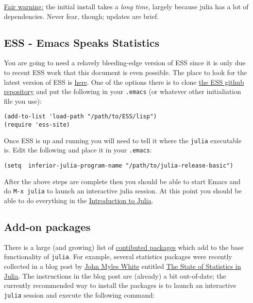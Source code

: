 \documentclass[11pt]{article}
\begin{document}
\underline{Fair warning:} the initial install takes a \emph{long time}, largely because julia has a lot of dependencies.  Never fear, though; updates are brief.
\subsection[ESS - Emacs Speaks Statistics]{ESS - Emacs Speaks Statistics}
\label{sec-1-2}

You are going to need a relavely bleeding-edge version of ESS since it is only due to recent ESS work that this document is even possible.  The place to look for the latest version of ESS is \href{http://stat.ethz.ch/ESS/index.php?Section=download}{here}.  One of the options there is to clone \href{https://github.com/emacs-ess/ESS}{the ESS github repository} and put the following in your \texttt{.emacs} (or whatever other initialiation file you use):

\begin{verbatim}
(add-to-list 'load-path "/path/to/ESS/lisp")
(require 'ess-site)
\end{verbatim}

Once ESS is up and running you will need to tell it where the \texttt{julia} executable is. Edit the following and place it in your \texttt{.emacs}:  

\begin{verbatim}
(setq  inferior-julia-program-name "/path/to/julia-release-basic")
\end{verbatim}

After the above steps are complete then you should be able to start Emacs and do \texttt{M-x julia} to launch an interactive julia session.  At this point you should be able to do everything in the \href{file://intro-julia.org}{Introduction to Julia}.
\subsection[Add-on packages]{Add-on packages}
\label{sec-1-3}

There is a large (and growing) list of \href{http://docs.julialang.org/en/release-0.1/packages/packagelist/}{contibuted packages} which add to the base functionality of \texttt{julia}.  For example, several statistics packages were recently collected in a blog post by \href{https://github.com/johnmyleswhite}{John Myles White} entitled \href{http://www.johnmyleswhite.com/notebook/2012/12/02/the-state-of-statistics-in-julia/}{The State of Statistics in Julia}.  The instructions in the blog post are (already) a bit out-of-date; the currently recommended way to install the packages is to launch an interactive \texttt{julia} session and execute the following command:
\end{document}
